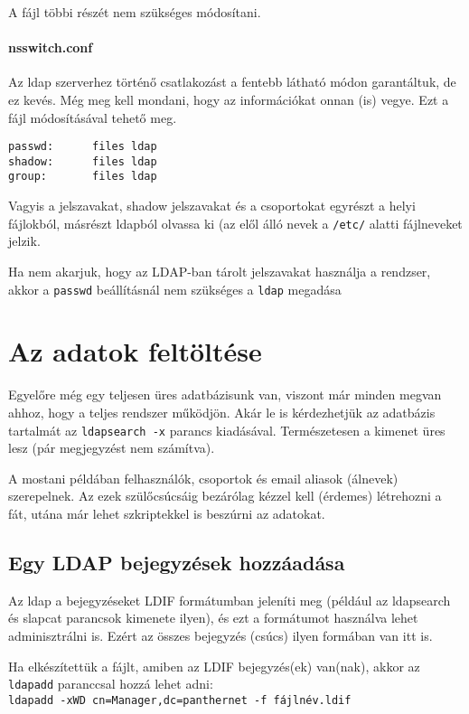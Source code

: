 A fájl többi részét nem szükséges módosítani.


\paragraph{nsswitch.conf} Az ldap szerverhez történő csatlakozást a fentebb látható módon garantáltuk, de ez
kevés. Még meg kell mondani, hogy az információkat onnan (is) vegye. Ezt a  fájl
módosításával tehető meg.

\begin{Verbatim}[frame=single,label=/etc/nsswitch.conf ldapot használó része]
passwd:      files ldap
shadow:      files ldap
group:       files ldap
\end{Verbatim}

Vagyis a jelszavakat, shadow jelszavakat és a csoportokat egyrészt a helyi fájlokból, másrészt ldapból olvassa ki (az
elől álló nevek a \texttt{/etc/} alatti fájlneveket jelzik.

Ha nem akarjuk, hogy az LDAP-ban tárolt jelszavakat használja a rendzser, akkor a \texttt{passwd} beállításnál nem
szükséges a \texttt{ldap} megadása

\section{Az adatok feltöltése}
Egyelőre még egy teljesen üres adatbázisunk van, viszont már minden megvan ahhoz, hogy a teljes rendszer működjön. Akár
le is kérdezhetjük az adatbázis tartalmát az \texttt{ldapsearch -x} parancs kiadásával. Természetesen a kimenet üres
lesz (pár megjegyzést nem számítva).

A mostani példában felhasználók, csoportok és email aliasok (álnevek) szerepelnek. Az ezek szülőcsúcsáig bezárólag
kézzel kell (érdemes) létrehozni a fát, utána már lehet szkriptekkel is beszúrni az adatokat.



\subsection{Egy LDAP bejegyzések hozzáadása}

Az ldap a bejegyzéseket LDIF formátumban jeleníti meg (például az ldapsearch és slapcat parancsok kimenete ilyen), és
ezt a formátumot használva lehet adminisztrálni is. Ezért az összes bejegyzés (csúcs) ilyen formában van itt is.

Ha elkészítettük a fájlt, amiben az LDIF bejegyzés(ek) van(nak), akkor az \texttt{ldapadd} paranccsal hozzá lehet adni:\\
\texttt{ldapadd -xWD cn=Manager,dc=panthernet -f fájlnév.ldif}


